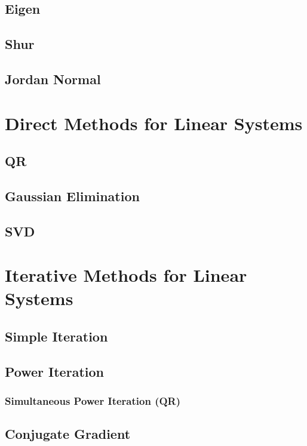 \documentclass[12pt]{article}
\begin{document}
\subsection{Eigen}


\subsection{Shur}

\subsection{Jordan Normal}



\section{Direct Methods for Linear Systems}
\subsection{QR}

\subsection{Gaussian Elimination}
\subsection{SVD}



\section{Iterative Methods for Linear Systems}
\subsection{Simple Iteration}

\subsection{Power Iteration}

\subsubsection{Simultaneous Power Iteration (QR)}


\subsection{Conjugate Gradient}
\end{document}
